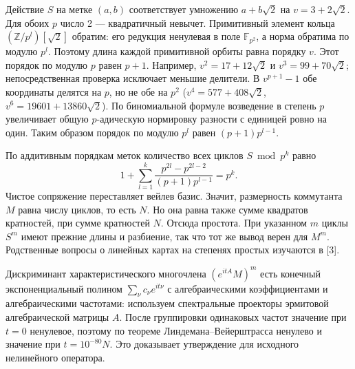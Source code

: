 \documentclass[11pt,a4paper]{article}
\newcommand{\Z}{\mathbb Z}
\begin{document}
Действие $S$ на метке $(a,b)$ соответствует умножению $a+b\sqrt2$ на $v=3+2\sqrt2$. Для обоих $p$ число 2 --- квадратичный невычет. Примитивный элемент кольца $(\Z/p^l)[\sqrt2]$ обратим: его редукция ненулевая в поле $\mathbb F_{p^2}$, а норма обратима по модулю $p^l$. Поэтому длина каждой примитивной орбиты равна порядку $v$. Этот порядок по модулю $p$ равен $p+1$. Например, $v^2=17+12\sqrt2$ и $v^3=99+70\sqrt2$; непосредственная проверка исключает меньшие делители. В $v^{p+1}-1$ обе координаты делятся на $p$, но не обе на $p^2$ ($v^4=577+408\sqrt2$, $v^6=19601+13860\sqrt2$). По биномиальной формуле возведение в степень $p$ увеличивает общую $p$-адическую нормировку разности с единицей ровно на один. Таким образом порядок по модулю $p^l$ равен $(p+1)p^{l-1}$.

По аддитивным порядкам меток количество всех циклов $S\bmod p^k$ равно
\[
       1+\sum_{l=1}^k\frac{p^{2l}-p^{2l-2}}{(p+1)p^{l-1}}=p^k.
\]
Чистое сопряжение переставляет вейлев базис. Значит, размерность коммутанта $M$ равна числу циклов, то есть $N$. Но она равна также сумме квадратов кратностей, при сумме кратностей $N$. Отсюда простота. При указанном $m$ циклы $S^m$ имеют прежние длины и разбиение, так что тот же вывод верен для $M^m$. Родственные вопросы о линейных картах на степенях простых изучаются в [3].

Дискриминант характеристического многочлена $(e^{itA}M)^m$ есть конечный экспоненциальный полином $\sum_\nu c_\nu e^{it\nu}$ с алгебраическими коэффициентами и алгебраическими частотами: используем спектральные проекторы эрмитовой алгебраической матрицы $A$. После группировки одинаковых частот значение при $t=0$ ненулевое, поэтому по теореме Линдемана--Вейерштрасса ненулево и значение при $t=10^{-80}N$. Это доказывает утверждение для исходного нелинейного оператора.
\end{document}
